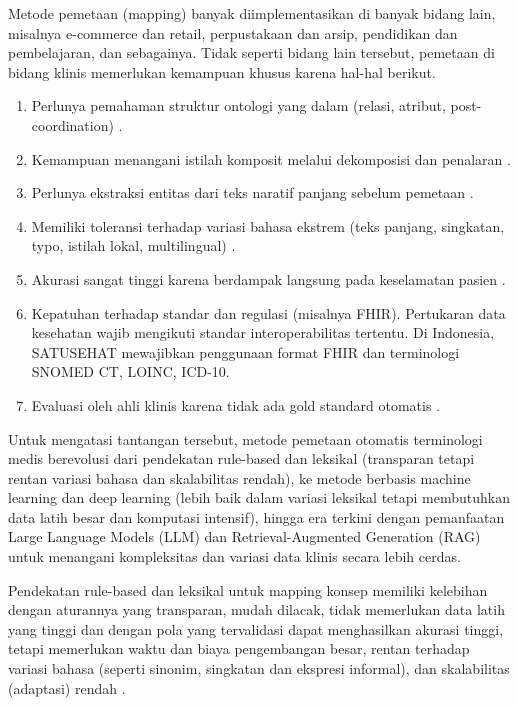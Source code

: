 Metode pemetaan (mapping) banyak diimplementasikan di banyak bidang lain, misalnya e-commerce dan retail, perpustakaan dan arsip, pendidikan dan pembelajaran, dan sebagainya. Tidak seperti bidang lain tersebut, pemetaan di bidang klinis memerlukan kemampuan khusus karena hal-hal berikut.
\begin{enumerate}
    \item Perlunya pemahaman struktur ontologi yang dalam (relasi, atribut, post-coordination) \citep{kate_automatic_2020,park_development_2026}.
    \item Kemampuan menangani istilah komposit melalui dekomposisi dan penalaran \citep{gilani_cde-mapper_2025}.
    \item Perlunya ekstraksi entitas dari teks naratif panjang sebelum pemetaan \citep{eslami_hybrid_2026,peterson_automating_2020}.
    \item Memiliki toleransi terhadap variasi bahasa ekstrem (teks panjang, singkatan, typo, istilah lokal, multilingual) \citep{chen_automatic_2022}.
    \item Akurasi sangat tinggi karena berdampak langsung pada keselamatan pasien \citep{yu_large_2026}.
    \item Kepatuhan terhadap standar dan regulasi (misalnya FHIR). Pertukaran data kesehatan wajib mengikuti standar interoperabilitas tertentu. Di Indonesia, SATUSEHAT mewajibkan penggunaan format FHIR dan terminologi SNOMED CT, LOINC, ICD-10.
    \item Evaluasi oleh ahli klinis karena tidak ada gold standard otomatis \citep{chen_automatic_2022,eslami_hybrid_2026,gilani_cde-mapper_2025}.
\end{enumerate}

Untuk mengatasi tantangan tersebut, metode pemetaan otomatis terminologi medis berevolusi dari pendekatan rule-based dan leksikal (transparan tetapi rentan variasi bahasa dan skalabilitas rendah), ke metode berbasis machine learning dan deep learning (lebih baik dalam variasi leksikal tetapi membutuhkan data latih besar dan komputasi intensif), hingga era terkini dengan pemanfaatan Large Language Models (LLM) dan Retrieval-Augmented Generation (RAG) untuk menangani kompleksitas dan variasi data klinis secara lebih cerdas.

Pendekatan rule-based dan leksikal untuk mapping konsep memiliki kelebihan dengan aturannya yang transparan, mudah dilacak, tidak memerlukan data latih yang tinggi dan dengan pola yang tervalidasi dapat menghasilkan akurasi tinggi, tetapi memerlukan waktu dan biaya pengembangan besar, rentan terhadap variasi bahasa (seperti sinonim, singkatan dan ekspresi informal), dan skalabilitas (adaptasi) rendah \citep{kim_automating_2014,meizoso_automated_2011}.


